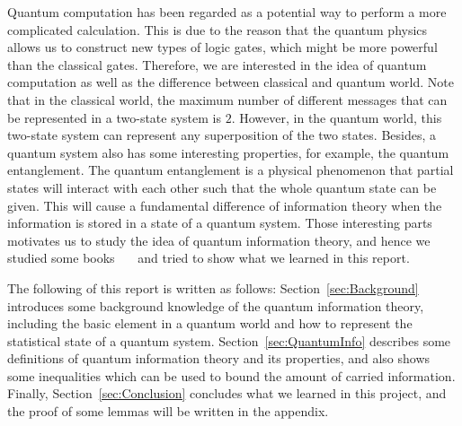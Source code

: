 Quantum computation has been regarded as a potential way to perform a more complicated calculation.
This is due to the reason that the quantum physics allows us to construct new types of logic gates, which might be more powerful than the classical gates.
Therefore, we are interested in the idea of quantum computation as well as the difference between classical and quantum world.
Note that in the classical world, the maximum number of different messages that can be represented in a two-state system is $2$.
However, in the quantum world, this two-state system can represent any superposition of the two states.
Besides, a quantum system also has some interesting properties, for example, the quantum entanglement.
The quantum entanglement is a physical phenomenon that partial states will interact with each other such that the whole quantum state can be given.
This will cause a fundamental difference of information theory when the information is stored in a state of a quantum system.
Those interesting parts motivates us to study the idea of quantum information theory, and hence we studied some books~\cite{CtoQ}~\cite{ElementsOfQ}~\cite{QCandQI} and tried to show what we learned in this report.

The following of this report is written as follows:
Section~\ref{sec:Background} introduces some background knowledge of the quantum information theory, including the basic element in a quantum world and how to represent the statistical state of a quantum system.
Section~\ref{sec:QuantumInfo} describes some definitions of quantum information theory and its properties, and also shows some inequalities which can be used to bound the amount of carried information.
Finally, Section~\ref{sec:Conclusion} concludes what we learned in this project, and the proof of some lemmas will be written in the appendix. 
